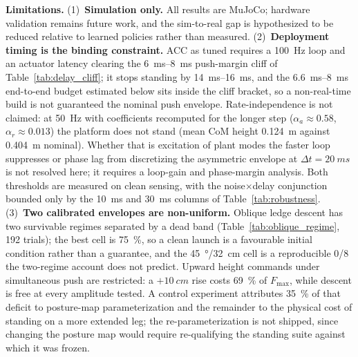 \documentclass[a4paper,fleqn]{cas-dc}
\begin{document}
\textbf{Limitations.}
(1)~\textbf{Simulation only.} All results are MuJoCo; hardware validation remains future work, and the sim-to-real gap is hypothesized to be reduced relative to learned policies rather than measured.
(2)~\textbf{Deployment timing is the binding constraint.} ACC as tuned requires a \SI{100}{Hz} loop and an actuator latency clearing the \SIrange{6}{8}{ms} push-margin cliff of Table~\ref{tab:delay_cliff}; it stops standing by \SIrange{14}{16}{ms}, and the \SIrange{6.6}{8}{ms} end-to-end budget estimated below sits inside the cliff bracket, so a non-real-time build is not guaranteed the nominal push envelope. Rate-independence is not claimed: at \SI{50}{Hz} with coefficients recomputed for the longer step ($\alpha_a{\approx}0.58$, $\alpha_r{\approx}0.013$) the platform does not stand (mean CoM height \SI{0.124}{m} against \SI{0.404}{m} nominal). Whether that is excitation of plant modes the faster loop suppresses or phase lag from discretizing the asymmetric envelope at $\Delta t{=}\SI{20}{ms}$ is not resolved here; it requires a loop-gain and phase-margin analysis. Both thresholds are measured on clean sensing, with the noise$\times$delay conjunction bounded only by the \SI{10}{ms} and \SI{30}{ms} columns of Table~\ref{tab:robustness}.
(3)~\textbf{Two calibrated envelopes are non-uniform.} Oblique ledge descent has two survivable regimes separated by a dead band (Table~\ref{tab:oblique_regime}, \num{192} trials); the best cell is \SI{75}{\percent}, so a clean launch is a favourable initial condition rather than a guarantee, and the \SI{45}{\degree}/\SI{32}{cm} cell is a reproducible \num{0}/\num{8} the two-regime account does not predict. Upward height commands under simultaneous push are restricted: a ${+}\SI{10}{cm}$ rise costs \SI{69}{\percent} of $F_{\max}$, while descent is free at every amplitude tested. A control experiment attributes \SI{35}{\percent} of that deficit to posture-map parameterization and the remainder to the physical cost of standing on a more extended leg; the re-parameterization is not shipped, since changing the posture map would require re-qualifying the standing suite against which it was frozen.
\end{document}
